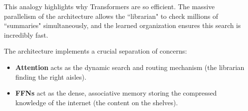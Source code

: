 \documentclass{article}
\begin{document}
\begin{tcolorbox}[colback=blue!5!white, colframe=blue!75!black, title=The Power of Organization and Separation of Concerns]
This analogy highlights why Transformers are so efficient. The massive parallelism of the architecture allows the ``librarian" to check millions of ``summaries" simultaneously, and the learned organization ensures this search is incredibly fast.

The architecture implements a crucial separation of concerns:
\begin{itemize}
   \item \textbf{Attention} acts as the dynamic search and routing mechanism (the librarian finding the right aisles).
   \item \textbf{FFNs} act as the dense, associative memory storing the compressed knowledge of the internet (the content on the shelves).
\end{itemize}
\end{tcolorbox}
\end{document}
